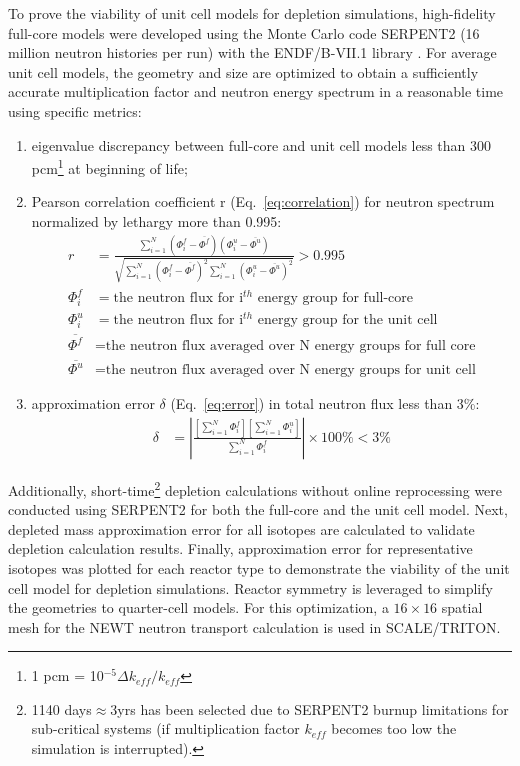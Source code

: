 \documentclass[letterpaper]{mandc2019}
\begin{document}
To prove the viability of unit cell models for depletion simulations, high-fidelity full-core models were developed using the Monte Carlo code SERPENT2 (16 million neutron histories per run) with the ENDF/B-VII.1 library \cite{leppanen_serpent_2015, chadwick_endf/b-vii.1_2011}. For average unit cell models, the geometry and size are optimized to obtain a sufficiently accurate multiplication factor and neutron energy spectrum in a reasonable time using specific metrics:
\begin{enumerate}
	\item eigenvalue discrepancy between full-core and unit cell models less than 300 pcm\footnote{ 1 pcm = 10$^{-5}\Delta k_{eff}/k_{eff}$} at beginning of life;\vspace{-0.2in}
	\item Pearson correlation coefficient r (Eq.~\ref{eq:correlation}) for neutron spectrum normalized by lethargy more than 0.995:
\begin{align}
r &= \frac{\sum_{i=1}^{N} (\Phi_i^f-\overline{\Phi^f})(\Phi_i^u-\overline{\Phi^u})}
		  {\sqrt{\sum_{i=1}^{N} (\Phi_i^f-\overline{\Phi^f})^2 \sum_{i=1}^{N} (\Phi_i^u-\overline{\Phi^u})^2}} > 0.995 \label{eq:correlation} \\
\Phi_i^f &= \mbox{the neutron flux for i$^{th}$ energy group for full-core} \nonumber\\
\Phi_i^u &= \mbox{the neutron flux for i$^{th}$ energy group for the unit cell} \nonumber\\
\overline{\Phi^f} &= \mbox{the neutron flux averaged over N energy groups for full core} \nonumber \\
\overline{\Phi^u} &= \mbox{the neutron flux averaged over N energy groups for unit cell} \nonumber
\end{align}		\vspace{-0.3in}
	\item approximation error $\delta$ (Eq.~\ref{eq:error})  in total neutron flux less than 3\%:
\begin{align}
\delta &= | \frac{[\sum_{i=1}^{N} \Phi_i^f] [\sum_{i=1}^{N} \Phi_i^u]}
{\sum_{i=1}^{N} \Phi_i^f} | \times 100\% < 3\% \label{eq:error}
\end{align}	
	\vspace{-0.4in}
\end{enumerate}

Additionally, short-time\footnote{1140 days$\approx$3yrs has been selected due to SERPENT2 burnup limitations for sub-critical systems (if multiplication factor $k_{eff}$ becomes too low the simulation is interrupted).} depletion calculations without online reprocessing were conducted using SERPENT2 for both the full-core and the unit cell model. Next, depleted mass approximation error for all isotopes are calculated to validate depletion calculation results. Finally, approximation error for representative isotopes was plotted for each reactor type to demonstrate the viability of the unit cell model for depletion simulations. Reactor symmetry is leveraged to simplify the geometries to quarter-cell models. For this optimization, a $16\times 16$ spatial mesh for the NEWT neutron transport calculation is used in SCALE/TRITON.
\end{document}
